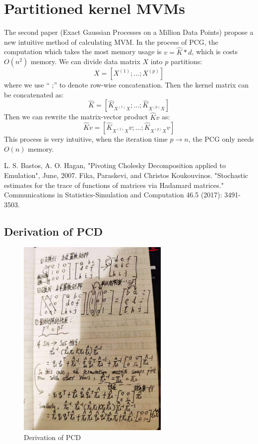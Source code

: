\documentclass{article} %
\newcounter{usage}
\begin{document}
 \section{Partitioned kernel MVMs}
 The second paper (Exact Gaussian Processes on a Million Data Points) propose a new intuitive method of calculating MVM. In the process of PCG, the  computation which takes the most memory usage is $v=\hat{K}*d$, which is costs $O(n^2)$ memory. We can divide data matrix $X$ into $p$ partitions:
 \begin{equation}
 X=[X^{(1)};...;X^{(p)}]
 \end{equation} 
 where we use “ ;” to denote row-wise concatenation. Then the kernel matrix can be concatenated as:
 \begin{equation}
 \hat{K}=[\hat{K}_{X^{(1)}X};...;\hat{K}_{X^{(p)}X}]
 \end{equation}
 Then we can rewrite the matrix-vector product $\hat{K}v$ as:
 \begin{equation}
 \hat{K}v=[\hat{K}_{X^{(1)}X}v;...;\hat{K}_{X^{(p)}X}v]
 \end{equation}
 This process is very intuitive, when the iteration time $p\rightarrow n$, the PCG only needs $O(n)$ memory.
\begin{thebibliography}{1}
	L. S. Bastos, A. O. Hagan, "Pivoting Cholesky Decomposition applied to Emulation", June, 2007.
	Fika, Paraskevi, and Christos Koukouvinos. "Stochastic estimates for the trace of functions of matrices via Hadamard matrices." Communications in Statistics-Simulation and Computation 46.5 (2017): 3491-3503.
	
	
\end{thebibliography}


\begin{appendices}
	\section{Derivation of PCD}
	 \begin{figure}[H]
		\begin{center}
			\includegraphics[width=0.65\textwidth]{111}
		\end{center}
		\caption{Derivation of PCD}
		\label{fig7}
	\end{figure}

\end{appendices}
\end{document}
